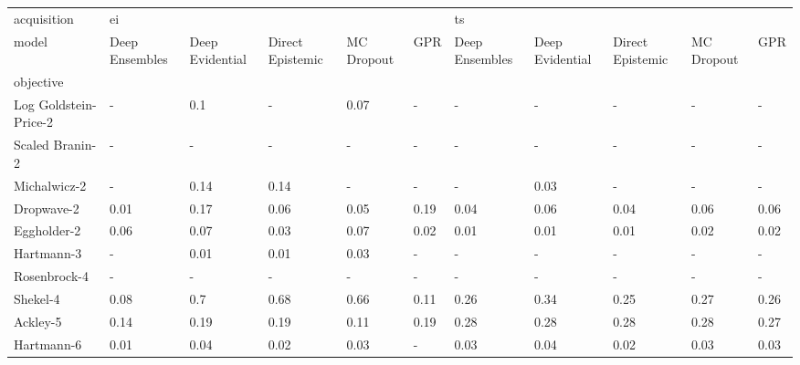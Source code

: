 \begin{tabular}{lllllllllll}
\toprule
acquisition & \multicolumn{5}{l}{ei} & \multicolumn{5}{l}{ts} \\
model & Deep Ensembles & Deep Evidential & Direct Epistemic & MC Dropout &   GPR & Deep Ensembles & Deep Evidential & Direct Epistemic & MC Dropout &   GPR \\
objective             &                &                 &                  &            &       &                &                 &                  &            &       \\
\midrule
Log Goldstein-Price-2 &              - &             0.1 &                - &       0.07 &     - &              - &               - &                - &          - &     - \\
Scaled Branin-2       &              - &               - &                - &          - &     - &              - &               - &                - &          - &     - \\
Michalwicz-2          &              - &            0.14 &             0.14 &          - &     - &              - &            0.03 &                - &          - &     - \\
Dropwave-2            &           0.01 &            0.17 &             0.06 &       0.05 &  0.19 &           0.04 &            0.06 &             0.04 &       0.06 &  0.06 \\
Eggholder-2           &           0.06 &            0.07 &             0.03 &       0.07 &  0.02 &           0.01 &            0.01 &             0.01 &       0.02 &  0.02 \\
Hartmann-3            &              - &            0.01 &             0.01 &       0.03 &     - &              - &               - &                - &          - &     - \\
Rosenbrock-4          &              - &               - &                - &          - &     - &              - &               - &                - &          - &     - \\
Shekel-4              &           0.08 &             0.7 &             0.68 &       0.66 &  0.11 &           0.26 &            0.34 &             0.25 &       0.27 &  0.26 \\
Ackley-5              &           0.14 &            0.19 &             0.19 &       0.11 &  0.19 &           0.28 &            0.28 &             0.28 &       0.28 &  0.27 \\
Hartmann-6            &           0.01 &            0.04 &             0.02 &       0.03 &     - &           0.03 &            0.04 &             0.02 &       0.03 &  0.03 \\
\bottomrule
\end{tabular}
